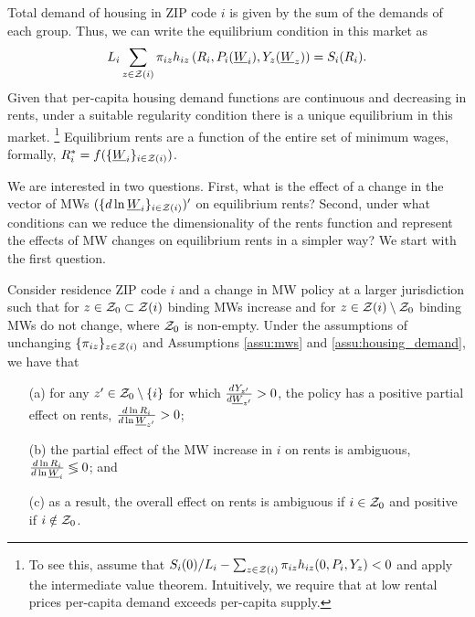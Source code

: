 Total demand of housing in ZIP code $i$ is given by the sum of the demands of 
each group.
Thus, we can write the equilibrium condition in this market as
\begin{equation}\label{eq:equilibrium}
	L_i \sum_{z\in\mathcal{Z}(i)} \pi_{iz} h_{iz} \left(R_i, P_i(\underline{W}_i), Y_z(\underline{W}_z)\right) = S_i(R_i) .
\end{equation}
Given that per-capita housing demand functions are continuous and decreasing 
in rents, under a suitable regularity condition there is a unique equilibrium 
in this market.%
\footnote{To see this, assume that 
$S_i(0)/L_i - \sum_{z\in\mathcal{Z}(i)} \pi_{iz} h_{iz} (0, P_i, Y_z) < 0$
and apply the intermediate value theorem.
Intuitively, we require that at low rental prices per-capita demand exceeds 
per-capita supply.}
Equilibrium rents are a function of the entire set of minimum wages, formally, 
$R^*_i = f(\{\underline{W}_i\}_{i\in\mathcal{Z}(i)})$.

We are interested in two questions.
First, what is the effect of a change in the vector of MWs 
$(\{d \ln \underline{W}_i\}_{i\in\mathcal{Z}(i)})'$ on equilibrium rents?
Second, under what conditions can we reduce the dimensionality of the rents 
function and represent the effects of MW changes on equilibrium rents in a 
simpler way?
We start with the first question.

\begin{prop}\label{prop:comparative_statics}
    Consider residence ZIP code $i$ and a change in MW policy at a larger
    jurisdiction such that for $z\in\mathcal{Z}_0 \subset \mathcal{Z}(i)$ binding MWs increase 
    and for $z\in\mathcal{Z}(i)\setminus \mathcal{Z}_0$ binding MWs do not change,
    where $\mathcal{Z}_0$ is non-empty.
    Under the assumptions of unchanging $\{\pi_{iz}\}_{z\in\mathcal{Z}(i)}$ 
    and Assumptions \ref{assu:mws} and \ref{assu:housing_demand},
    we have that
    \begin{enumerate}
        \item[(a)]
        for any $z'\in\mathcal{Z}_0\setminus\{i\}$ for which $\frac{d Y_{z'}}{d \underline{W}_{z'}}>0$, 
        the policy has a positive partial effect on rents, 
        $\frac{d\ln R_i}{d\ln\underline{W}_{z'}} > 0$;
        \item[(b)]
        the partial effect of the MW increase in $i$ on rents is ambiguous, 
        $\frac{d\ln R_i}{d\ln\underline{W}_i} \lessgtr 0$; and
        \item[(c)]
        as a result, the overall effect on rents is ambiguous if $i\in\mathcal{Z}_0$ 
        and positive if $i\notin\mathcal{Z}_0$.
    \end{enumerate}
\end{prop}

